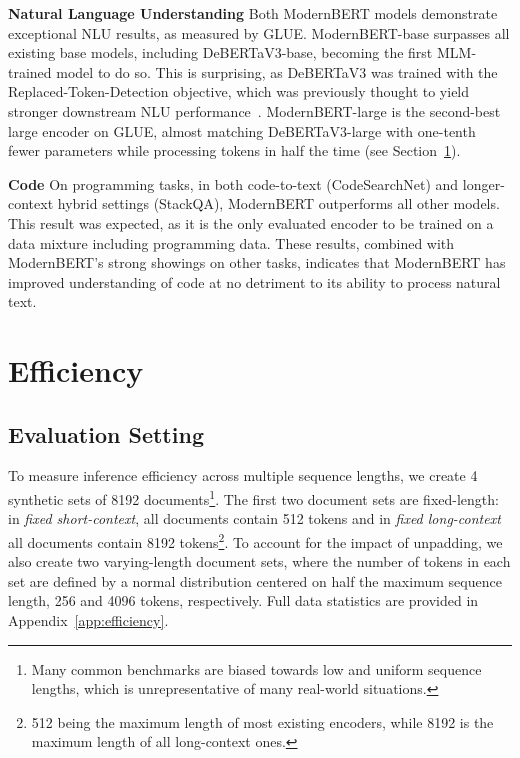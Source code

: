\documentclass[11pt]{article}
\begin{document}
\textbf{Natural Language Understanding} Both ModernBERT models demonstrate exceptional NLU results, as measured by GLUE. ModernBERT-base surpasses all existing base models, including DeBERTaV3-base, becoming the first MLM-trained model to do so. This is surprising, as DeBERTaV3 was trained with the Replaced-Token-Detection objective, which was previously thought to yield stronger downstream NLU performance~\cite{electra,debertav3}. ModernBERT-large is the second-best large encoder on GLUE, almost matching DeBERTaV3-large with one-tenth fewer parameters while processing tokens in half the time (see Section~\ref{sec:efficiencyresults}). 

\textbf{Code} On programming tasks, in both code-to-text (CodeSearchNet) and longer-context hybrid settings (StackQA), ModernBERT outperforms all other models. This result was expected, as it is the only evaluated encoder to be trained on a data mixture including programming data. These results, combined with ModernBERT's strong showings on other tasks, indicates that ModernBERT has improved understanding of code at no detriment to its ability to process natural text.


\section{Efficiency}
\label{sec:efficiencyresults}

\subsection{Evaluation Setting}

To measure inference efficiency across multiple sequence lengths, we create 4 synthetic sets of 8192 documents\footnote{Many common benchmarks are biased towards low and uniform sequence lengths, which is unrepresentative of many real-world situations.}.
The first two document sets are fixed-length: in \textit{fixed short-context}, all documents contain 512 tokens and in \textit{fixed long-context} all documents contain 8192 tokens\footnote{512 being the maximum length of most existing encoders, while 8192 is the maximum length of all long-context ones.}. To account for the impact of unpadding, we also create two varying-length document sets, where the number of tokens in each set are defined by a normal distribution centered on half the maximum sequence length, 256 and 4096 tokens, respectively. Full data statistics are provided in Appendix~\ref{app:efficiency}.
\end{document}

